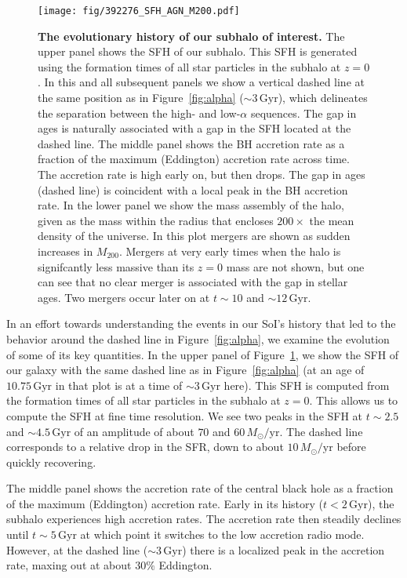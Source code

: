 \documentclass[linenumbers, twocolumn]{aastex631}
\newcommand{\Msun}{\ensuremath{M_{\odot}}}
\newcommand{\Gyr}{\ensuremath{\textrm{Gyr}}}
\newcommand{\Msunyr}{\ensuremath{\Msun/\textrm{yr}}}
\begin{document}
\begin{figure}
  \centering
  \texttt{[image: fig/392276\_SFH\_AGN\_M200.pdf]}
  \caption{\textbf{The evolutionary history of our subhalo of interest.} The upper panel shows the SFH of our subhalo. This SFH is generated using the formation times of all star particles in the subhalo at $z=0$. In this and all subsequent panels we show a vertical dashed line at the same position as in Figure~\ref{fig:alpha} ($\sim3\,\Gyr$), which delineates the separation between the high- and low-$\alpha$ sequences. The gap in ages is naturally associated with a gap in the SFH located at the dashed line. The middle panel shows the BH accretion rate as a fraction of the maximum (Eddington) accretion rate across time. The accretion rate is high early on, but then drops. The gap in ages (dashed line) is coincident with a local peak in the BH accretion rate. In the lower panel we show the mass assembly of the halo, given as the mass within the radius that encloses $200\times$ the mean density of the universe. In this plot mergers are shown as sudden increases in $M_{200}$. Mergers at very early times when the halo is signifcantly less massive than its $z=0$ mass are not shown, but one can see that no clear merger is associated with the gap in stellar ages. Two mergers occur later on at $t\sim10$ and $\sim12\,\Gyr$.}
  \label{fig:history}
\end{figure}

In an effort towards understanding the events in our SoI's history that led to the behavior around the dashed line in Figure~\ref{fig:alpha}, we examine the evolution of some of its key quantities. In the upper panel of Figure~\ref{fig:history}, we show the SFH of our galaxy with the same dashed line as in Figure~\ref{fig:alpha} (at an age of $10.75\,\Gyr$ in that plot is at a time of $\sim3\,\Gyr$ here). This SFH is computed from the formation times of all star particles in the subhalo at $z=0$. This allows us to compute the SFH at fine time resolution. We see two peaks in the SFH at $t\sim2.5$ and $\sim4.5\,\Gyr$ of an amplitude of about $70$ and $60\,\Msunyr$. The dashed line corresponds to a relative drop in the SFR, down to about $10\,\Msunyr$ before quickly recovering.

The middle panel shows the accretion rate of the central black hole as a fraction of the maximum (Eddington) accretion rate. Early in its history ($t<2\,\Gyr$), the subhalo experiences high accretion rates. The accretion rate then steadily declines until $t\sim5\,\Gyr$ at which point it switches to the low accretion radio mode. However, at the dashed line ($\sim3\,\Gyr$) there is a localized peak in the accretion rate, maxing out at about $30\%$ Eddington.
\end{document}
